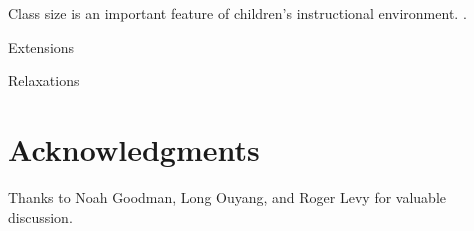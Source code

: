 \documentclass[10pt,letterpaper]{article}
\begin{document}
Class size is an important feature of children's instructional environment. \cite{glass1979}.


Extensions

Relaxations



\section{Acknowledgments}

Thanks to Noah Goodman, Long Ouyang, and Roger Levy for valuable discussion.



\setlength{\bibleftmargin}{.125in}
\setlength{\bibindent}{-\bibleftmargin}


\end{document}
